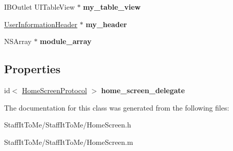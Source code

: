 \begin{DoxyCompactItemize}
\item 
\hypertarget{interface_home_screen_abdb6c9cf3364f9836d2f352196590b93}{
\-I\-B\-Outlet \-U\-I\-Table\-View $\ast$ {\bfseries my\-\_\-table\-\_\-view}}
\label{interface_home_screen_abdb6c9cf3364f9836d2f352196590b93}

\item 
\hypertarget{interface_home_screen_a78cb7c77a88015901be6bd8a88bdd8c6}{
\hyperlink{interface_user_information_header}{\-User\-Information\-Header} $\ast$ {\bfseries my\-\_\-header}}
\label{interface_home_screen_a78cb7c77a88015901be6bd8a88bdd8c6}

\item 
\hypertarget{interface_home_screen_a110fe501fa8cc6d60fdc547812440690}{
\-N\-S\-Array $\ast$ {\bfseries module\-\_\-array}}
\label{interface_home_screen_a110fe501fa8cc6d60fdc547812440690}

\end{DoxyCompactItemize}
\subsection*{\-Properties}
\begin{DoxyCompactItemize}
\item 
\hypertarget{interface_home_screen_ae585d79755cf3014e386061dfeb99bae}{
id$<$ \hyperlink{protocol_home_screen_protocol-p}{\-Home\-Screen\-Protocol} $>$ {\bfseries home\-\_\-screen\-\_\-delegate}}
\label{interface_home_screen_ae585d79755cf3014e386061dfeb99bae}

\end{DoxyCompactItemize}


\-The documentation for this class was generated from the following files\-:\begin{DoxyCompactItemize}
\item 
\-Staff\-It\-To\-Me/\-Staff\-It\-To\-Me/\-Home\-Screen.\-h\item 
\-Staff\-It\-To\-Me/\-Staff\-It\-To\-Me/\-Home\-Screen.\-m\end{DoxyCompactItemize}
